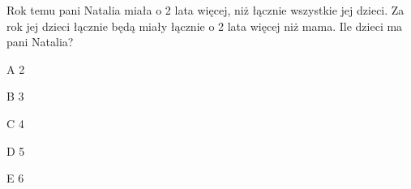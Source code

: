 \begin{tresc}
Rok temu pani Natalia miała o 2 lata więcej, niż łącznie wszystkie jej dzieci. Za rok jej dzieci łącznie będą miały łącznie o 2 lata więcej niż mama. Ile dzieci ma pani Natalia?
\end{tresc}
\begin{wariant}{A} 2 \end{wariant}
\begin{wariant}{B} 3 \end{wariant}
\begin{wariant}{C} 4 \end{wariant}
\begin{wariant}{D} 5 \end{wariant}
\begin{wariant}{E} 6 \end{wariant}
